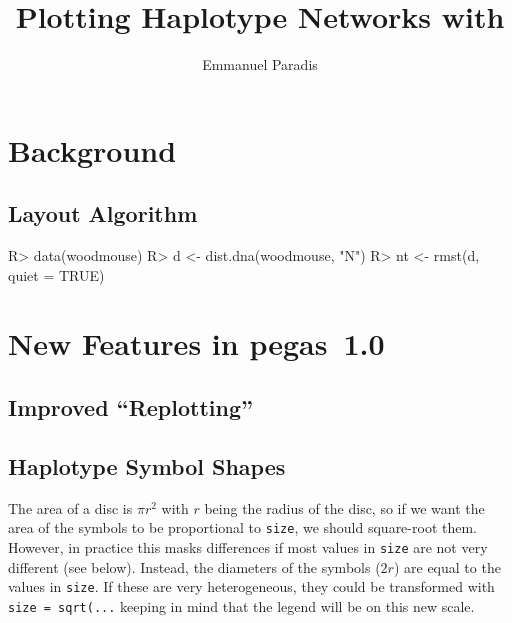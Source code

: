\documentclass[a4paper]{article}
\author{Emmanuel Paradis}
\title{Plotting Haplotype Networks with \pegas}
\newcommand{\code}{\texttt}
\newcommand{\pkg}{\textsf}
\newcommand{\pegas}{\pkg{pegas}}
\begin{document}
\maketitle
\tableofcontents

\vspace{1cm}


\section{Background}

\subsection{Layout Algorithm}

\begin{Schunk}
\begin{Sinput}
R> data(woodmouse)
R> d <- dist.dna(woodmouse, "N")
R> nt <- rmst(d, quiet = TRUE)
\end{Sinput}
\end{Schunk}

\section{New Features in \pegas\ 1.0}

\subsection{Improved ``Replotting''}

\subsection{Haplotype Symbol Shapes}

The area of a disc is $\pi r^2$ with $r$ being the radius of the disc, so if
we want the area of the symbols to be proportional to \code{size}, we
should square-root them. However, in practice this masks differences
if most values in \code{size} are not very different (see
below). Instead, the diameters of the symbols ($2r$) are equal to the
values in \code{size}. If these are very heterogeneous, they could be
transformed with \code{size = sqrt(...} keeping in mind that the legend
will be on this new scale.
\end{document}
